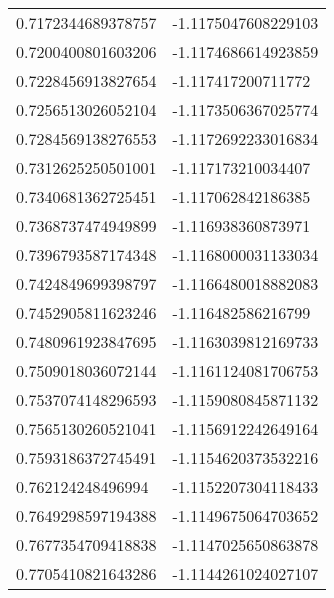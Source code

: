 \begin{supertabular}{ll}
0.7172344689378757  & -1.1175047608229103   \\
0.7200400801603206  & -1.1174686614923859   \\
0.7228456913827654  & -1.117417200711772    \\
0.7256513026052104  & -1.1173506367025774   \\
0.7284569138276553  & -1.1172692233016834   \\
0.7312625250501001  & -1.117173210034407    \\
0.7340681362725451  & -1.117062842186385    \\
0.7368737474949899  & -1.116938360873971    \\
0.7396793587174348  & -1.1168000031133034   \\
0.7424849699398797  & -1.1166480018882083   \\
0.7452905811623246  & -1.116482586216799    \\
0.7480961923847695  & -1.1163039812169733   \\
0.7509018036072144  & -1.1161124081706753   \\
0.7537074148296593  & -1.1159080845871132   \\
0.7565130260521041  & -1.1156912242649164   \\
0.7593186372745491  & -1.1154620373532216   \\
0.762124248496994   & -1.1152207304118433   \\
0.7649298597194388  & -1.1149675064703652   \\
0.7677354709418838  & -1.1147025650863878   \\
0.7705410821643286  & -1.1144261024027107   \\
\end{supertabular}
